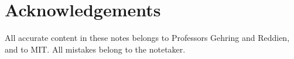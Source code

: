 \section*{Acknowledgements}

All accurate content in these notes belongs to Professors Gehring and Reddien, and to MIT.
All mistakes belong to the notetaker. 
